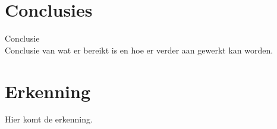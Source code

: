\documentclass{article}
\begin{document}
\section{Conclusies}
Conclusie\cite{sortingNetworksSize2014}\\
Conclusie van wat er bereikt is en hoe er verder aan gewerkt kan worden.\cite{sortingNetworksTheEndGame}

\section*{Erkenning}
Hier komt de erkenning.






\end{document}
